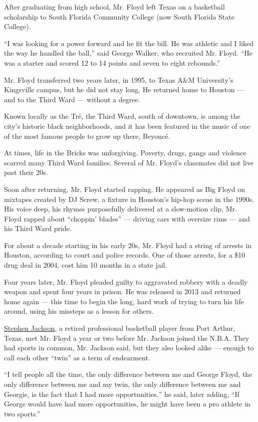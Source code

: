 After graduating from high school, Mr. Floyd left Texas on a basketball
scholarship to South Florida Community College (now South Florida State
College).

``I was looking for a power forward and he fit the bill. He was athletic
and I liked the way he handled the ball,'' said George Walker, who
recruited Mr. Floyd. ``He was a starter and scored 12 to 14 points and
seven to eight rebounds.''

Mr. Floyd transferred two years later, in 1995, to Texas A\&M
University's Kingsville campus, but he did not stay long. He returned
home to Houston --- and to the Third Ward --- without a degree.

Known locally as the Tré, the Third Ward, south of downtown, is among
the city's historic black neighborhoods, and it has been featured in the
music of one of the most famous people to grow up there, Beyoncé.

At times, life in the Bricks was unforgiving. Poverty, drugs, gangs and
violence scarred many Third Ward families. Several of Mr. Floyd's
classmates did not live past their 20s.

Soon after returning, Mr. Floyd started rapping. He appeared as Big
Floyd on mixtapes created by DJ Screw, a fixture in Houston's hip-hop
scene in the 1990s. His voice deep, his rhymes purposefully delivered at
a slow-motion clip, Mr. Floyd rapped about ``choppin' blades'' ---
driving cars with oversize rims --- and his Third Ward pride.

For about a decade starting in his early 20s, Mr. Floyd had a string of
arrests in Houston, according to court and police records. One of those
arrests, for a \$10 drug deal in 2004, cost him 10 months in a state
jail.

Four years later, Mr. Floyd pleaded guilty to aggravated robbery with a
deadly weapon and spent four years in prison. He was released in 2013
and returned home again --- this time to begin the long, hard work of
trying to turn his life around, using his missteps as a lesson for
others.

\href{https://www.nytimes3xbfgragh.onion/2020/06/11/sports/basketball/stephen-jackson-george-floyd-protests.html}{Stephen
Jackson}, a retired professional basketball player from Port Arthur,
Texas, met Mr. Floyd a year or two before Mr. Jackson joined the N.B.A.
They had sports in common, Mr. Jackson said, but they also looked alike
--- enough to call each other ``twin'' as a term of endearment.

``I tell people all the time, the only difference between me and George
Floyd, the only difference between me and my twin, the only difference
between me and Georgie, is the fact that I had more opportunities,'' he
said, later adding, ``If George would have had more opportunities, he
might have been a pro athlete in two sports.''

